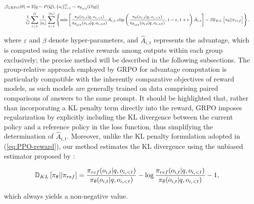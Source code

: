 \begin{itemize}[topsep=0pt]
\begin{equation}
\footnotesize
\begin{split}
    \mathcal{J}_{GRPO}(\theta) &= \mathbb{E}{[q \sim P(Q), \{o_i\}_{i=1}^G \sim \pi_{\theta_{old}}(O|q)]}  \\
    & \frac{1}{G}\sum_{i=1}^G\frac{1}{|o_i|} \sum_{t=1}^{|o_i|} \left\{ \min \left[ \frac{\pi_\theta(o_{i,t} | q, o_{i,<t})}{\pi_{\theta_{old}}(o_{i,t} | q, o_{i,<t})} \hat{A}_{i,t}, \text{clip} \left( \frac{\pi_\theta(o_{i,t} | q, o_{i,<t})}{\pi_{\theta_{old}}(o_{i,t} | q, o_{i,<t})}, 1 - \varepsilon, 1 + \varepsilon \right)  \hat{A}_{i,t} \right] - \beta \mathbb{D}_{KL}\left[\pi_{\theta} || \pi_{ref}\right]\right\} ,
\end{split}
\label{eq:GRPO-obj}
\end{equation}

where $\varepsilon$ and $\beta$ denote hyper-parameters, and $\hat{A}_{i,t}$ represents the advantage, which is computed using the relative rewards among outputs within each group exclusively; the precise method will be described in the following subsections. The group-relative approach employed by GRPO for advantage computation is particularly compatible with the inherently comparative objectives of reward models, as such models are generally trained on data comprising paired comparisons of answers to the same prompt. It should be highlighted that, rather than incorporating a KL penalty term directly into the reward, GRPO imposes regularization by explicitly including the KL divergence between the current policy and a reference policy in the loss function, thus simplifying the determination of $\hat{A}_{i,t}$. Moreover, unlike the KL penalty formulation adopted in (\ref{eq:PPO-reward}), our method estimates the KL divergence using the unbiased estimator proposed by \citep{kl_approx}:

\begin{equation}
\small
    \mathbb{D}_{KL}\left[\pi_{\theta} || \pi_{ref}\right] = \frac{\pi_{ref}(o_{i,t}|q,o_{i,<t})}{\pi_{\theta}(o_{i,t}|q,o_{i,<t})}- \log\frac{\pi_{ref}(o_{i,t}|q,o_{i,<t})}{\pi_{\theta}(o_{i,t}|q,o_{i,<t})} - 1,
\end{equation}

which always yields a non-negative value.


\end{itemize}
